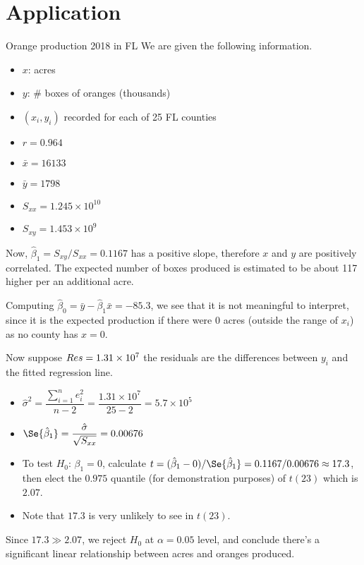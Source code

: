 \section{Application}
\begin{Example}{Orange production 2018 in FL}{}
    We are given the following information.
    \begin{itemize}
        \item $ x $: acres
        \item $ y $: \# boxes of oranges (thousands)
        \item $ (x_i,y_i) $ recorded for each of 25 FL counties
        \item $ r=0.964 $
        \item $ \bar{x}=16133 $
        \item $ \bar{y}=1798 $
        \item $ S_{xx}=1.245\times 10^{10} $
        \item $ S_{xy}=1.453\times 10^9 $
    \end{itemize}
    Now,
    $ \hat{\beta}_1=S_{xy}/S_{xx}=0.1167 $
    has a positive slope, therefore $ x $ and $ y $ are
    positively correlated.
    The expected number of boxes produced is estimated to be about 117
    higher per an additional acre.

    Computing
    $ \hat{\beta}_0=\bar{y}-\hat{\beta}_1\bar{x}=-85.3 $,
    we see that it is
    not meaningful to interpret, since it
    is the expected production if there were 0 acres
    (outside the range of $ x_i $) as no county has $ x=0 $.

    Now suppose $ \relax{Res}=1.31\times 10^7 $
    the residuals are the differences between $ y_i $ and the fitted regression
    line.
    \begin{itemize}
        \item $ \hat{\sigma}^2=\dfrac{\sum_{i=1}^{n} e_i^2}{n-2}=
                  \dfrac{1.31\times 10^7}{25-2}=5.7\times 10^5 $
        \item $ \Se{\hat{\beta}_1}=\dfrac{\hat{\sigma}}{\sqrt{S_{xx}}}=0.00676 $
        \item To test $ H_0 $: $ \beta_1 =0 $,
              calculate
              $ t=(\hat{\beta}_1-0)/\Se{\hat{\beta}_1}=0.1167/0.00676
                  \approx 17.3 $,
              then elect the $ 0.975 $ quantile (for demonstration purposes) of $ t(23) $
              which is $ 2.07 $.
        \item Note that $ 17.3 $ is very unlikely to see in $ t(23) $.
    \end{itemize}
    Since $ 17.3\gg2.07 $, we reject $ H_0 $ at $ \alpha=0.05 $
    level, and conclude there's a significant linear relationship between
    acres and oranges produced.


\end{Example}
